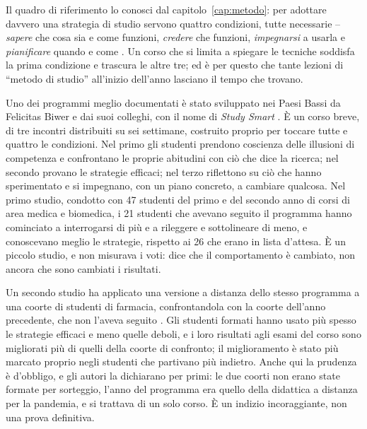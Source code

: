 Il quadro di riferimento lo conosci dal capitolo~\ref{cap:metodo}: per
adottare davvero una strategia di studio servono quattro condizioni,
tutte necessarie -- \emph{sapere} che cosa sia e come funzioni,
\emph{credere} che funzioni, \emph{impegnarsi} a usarla e
\emph{pianificare} quando e come \parencite{mcdaniel2020}. Un corso che
si limita a spiegare le tecniche soddisfa la prima condizione e
trascura le altre tre; ed è per questo che tante lezioni di
\enquote{metodo di studio} all'inizio dell'anno lasciano il tempo che
trovano.

Uno dei programmi meglio documentati è stato sviluppato nei Paesi
Bassi da Felicitas Biwer e dai suoi colleghi, con il nome di
\emph{Study Smart} \parencite{biwer2020}. È un corso breve, di tre
incontri distribuiti su sei settimane, costruito proprio per toccare
tutte e quattro le condizioni. Nel primo gli studenti prendono
coscienza delle illusioni di competenza e confrontano le proprie
abitudini con ciò che dice la ricerca; nel secondo provano le
strategie efficaci; nel terzo riflettono
su ciò che hanno sperimentato e si impegnano, con un piano concreto, a
cambiare qualcosa. Nel primo studio, condotto con 47 studenti del
primo e del secondo anno di corsi di area medica e biomedica, i 21
studenti che avevano seguito il programma hanno cominciato a
interrogarsi di più e a rileggere e sottolineare di meno, e
conoscevano meglio le strategie, rispetto ai 26 che erano in lista
d'attesa. È un piccolo studio, e non misurava i voti: dice che il
comportamento è cambiato, non ancora che sono cambiati i risultati.

Un secondo studio ha applicato una versione a distanza dello stesso
programma a una coorte di studenti di farmacia, confrontandola
con la coorte dell'anno precedente, che non l'aveva seguito
\parencite{biwer2023}. Gli studenti formati hanno usato più spesso le
strategie efficaci e meno quelle deboli, e i loro risultati agli esami
del corso sono migliorati più di quelli della coorte di confronto; il
miglioramento è stato più marcato proprio negli studenti che partivano
più indietro. Anche qui la prudenza è d'obbligo, e gli autori la
dichiarano per primi: le due coorti non erano state formate per
sorteggio, l'anno del programma era quello della didattica a distanza
per la pandemia, e si trattava di un solo corso. È un indizio
incoraggiante, non una prova definitiva.

